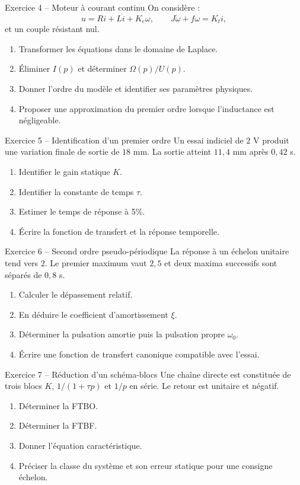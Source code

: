 \begin{TLExercise}{Exercice 4 -- Moteur à courant continu}
On considère :
\[
u=Ri+L\dot{i}+K_e\omega,
\qquad
J\dot{\omega}+f\omega=K_t i,
\]
et un couple résistant nul.
\begin{enumerate}
  \item Transformer les équations dans le domaine de Laplace.
  \item Éliminer $I(p)$ et déterminer $\Omega(p)/U(p)$.
  \item Donner l'ordre du modèle et identifier ses paramètres physiques.
  \item Proposer une approximation du premier ordre lorsque l'inductance est négligeable.
\end{enumerate}
\end{TLExercise}

\begin{TLExercise}{Exercice 5 -- Identification d'un premier ordre}
Un essai indiciel de $2$ V produit une variation finale de sortie de $18$ mm. La sortie atteint $11{,}4$ mm après $0{,}42$ s.
\begin{enumerate}
  \item Identifier le gain statique $K$.
  \item Identifier la constante de temps $\tau$.
  \item Estimer le temps de réponse à 5\%.
  \item Écrire la fonction de transfert et la réponse temporelle.
\end{enumerate}
\end{TLExercise}

\begin{TLExercise}{Exercice 6 -- Second ordre pseudo-périodique}
La réponse à un échelon unitaire tend vers $2$. Le premier maximum vaut $2{,}5$ et deux maxima successifs sont séparés de $0{,}8$ s.
\begin{enumerate}
  \item Calculer le dépassement relatif.
  \item En déduire le coefficient d'amortissement $\xi$.
  \item Déterminer la pulsation amortie puis la pulsation propre $\omega_0$.
  \item Écrire une fonction de transfert canonique compatible avec l'essai.
\end{enumerate}
\end{TLExercise}

\begin{TLExercise}{Exercice 7 -- Réduction d'un schéma-blocs}
Une chaîne directe est constituée de trois blocs $K$, $1/(1+\tau p)$ et $1/p$ en série. Le retour est unitaire et négatif.
\begin{enumerate}
  \item Déterminer la FTBO.
  \item Déterminer la FTBF.
  \item Donner l'équation caractéristique.
  \item Préciser la classe du système et son erreur statique pour une consigne échelon.
\end{enumerate}
\end{TLExercise}

